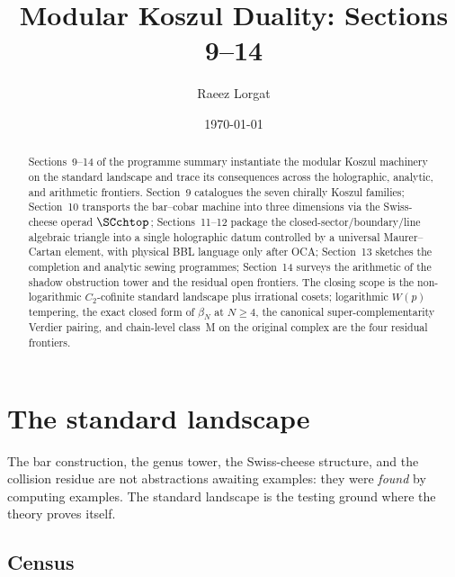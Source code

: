 \documentclass[11pt,reqno]{amsart}
\theoremstyle{definition}
\theoremstyle{remark}
\numberwithin{equation}{section}
\begin{document}
\title[Programme Summary: Sections 9--14]
{Modular Koszul Duality: Sections 9--14}

\author{Raeez Lorgat}
\address{Perimeter Institute for Theoretical Physics,
 Waterloo, ON N2L 2Y5, Canada}

\date{\today}

\begin{abstract}
Sections~9--14 of the programme summary instantiate the modular
Koszul machinery on the standard landscape and trace its
consequences across the holographic, analytic, and arithmetic
frontiers. Section~9 catalogues the seven chirally Koszul
families; Section~10 transports the bar--cobar machine into three
dimensions via the Swiss-cheese operad $\SCchtop$; Sections~11--12
package the closed-sector/boundary/line algebraic triangle into a
single holographic datum controlled by a universal Maurer--Cartan
element, with physical BBL language only after OCA; Section~13
sketches the completion and analytic sewing programmes; Section~14
surveys the arithmetic of the shadow obstruction tower and the
residual open frontiers. The closing scope is the
non-logarithmic $C_2$-cofinite standard landscape plus irrational
cosets; logarithmic $W(p)$ tempering, the exact closed form of
$\beta_N$ at $N\ge 4$, the canonical super-complementarity Verdier
pairing, and chain-level class~M on the original complex are the
four residual frontiers.
\end{abstract}

\maketitle

\section{The standard landscape}
\label{sec:landscape}

The bar construction, the genus tower, the Swiss-cheese
structure, and the collision residue are not abstractions
awaiting examples: they were \emph{found} by computing
examples. The standard landscape is the testing ground
where the theory proves itself.

\subsection{Census}
\label{ssec:census}
\end{document}
